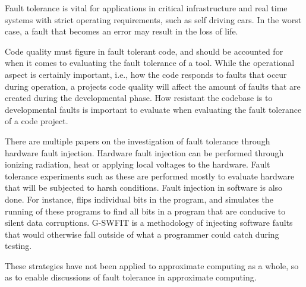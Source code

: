 Fault tolerance is vital for applications in critical infrastructure and real time systems with strict operating requirements, such as self driving cars. In the worst case, a fault that becomes an error may result in the loss of life. 

Code quality must figure in fault tolerant code, and should be accounted for when it comes to evaluating the fault tolerance of a tool. While the operational aspect is certainly important, i.e., how the code responds to faults that occur during operation, a projects code quality will affect the amount of faults that are created during the developmental phase. How resistant the codebase is to developmental faults is important to evaluate when evaluating the fault tolerance of a code project.

There are multiple papers on the investigation of fault tolerance through hardware fault injection. Hardware fault injection can be performed through ionizing radiation, heat or applying local voltages to the hardware. Fault tolerance experiments such as these are performed mostly to evaluate hardware that will be subjected to harsh conditions. 
Fault injection in software is also done. For instance,  flips individual bits in the program, and simulates the running of these programs to find all bits in a program that are conducive to silent data corruptions.  G-SWFIT is a methodology of injecting software faults that would otherwise fall outside of what a programmer could catch during testing. 

These strategies have not been applied to approximate computing as a whole, so as to enable discussions of fault tolerance in approximate computing.

